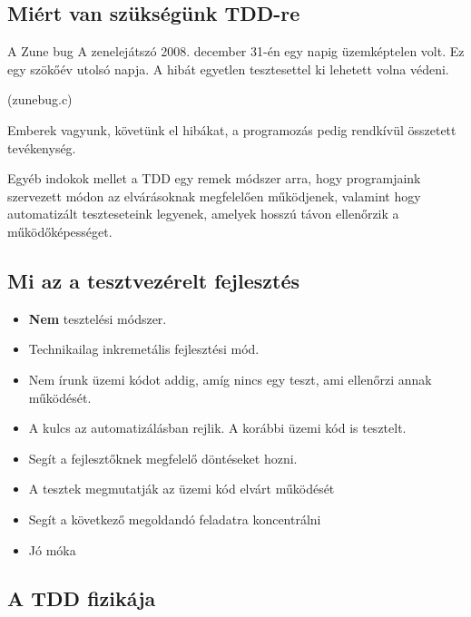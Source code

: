 \subsection{Miért van szükségünk TDD-re}

\begin{frame}{A Zune bug}
  A zenelejátszó 2008. december 31-én egy napig üzemképtelen volt. Ez
  egy szökőév utolsó napja. A hibát egyetlen tesztesettel ki lehetett
  volna védeni.

  (zunebug.c)
\end{frame}

\begin{frame}{}
  Emberek vagyunk, követünk el hibákat, a programozás pedig rendkívül
  összetett tevékenység.

  \pause

  Egyéb indokok mellet a TDD egy remek módszer arra, hogy programjaink
  szervezett módon az elvárásoknak megfelelően működjenek, valamint
  hogy automatizált teszteseteink legyenek, amelyek hosszú távon
  ellenőrzik a működőképességet.
\end{frame}

\subsection{Mi az a tesztvezérelt fejlesztés}

\begin{frame}{}
  \begin{itemize}[<+->]
  \item \textbf{Nem} tesztelési módszer.
  \item Technikailag inkremetális fejlesztési mód.
  \item Nem írunk üzemi kódot addig, amíg nincs egy teszt, ami ellenőrzi annak működését.
  \item A kulcs az automatizálásban rejlik. A korábbi üzemi kód is tesztelt.
  \item Segít a fejlesztőknek megfelelő döntéseket hozni.
  \item A tesztek megmutatják az üzemi kód elvárt működését
  \item Segít a következő megoldandó feladatra koncentrálni
  \item Jó móka
  \end{itemize}
\end{frame}

\subsection{A TDD fizikája}

